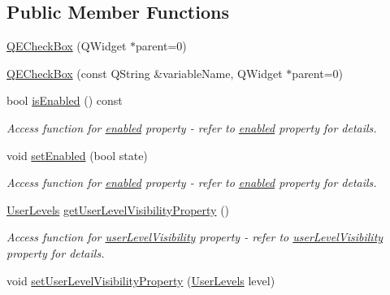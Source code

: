 \subsection*{Public Member Functions}
\begin{DoxyCompactItemize}
\item 
\hyperlink{classQECheckBox_a63681fe0a55f7f631d129968183af324}{QECheckBox} (QWidget $\ast$parent=0)
\item 
\hyperlink{classQECheckBox_a56de4a442b6ad1509ab2f1c8fcbd6dab}{QECheckBox} (const QString \&variableName, QWidget $\ast$parent=0)
\item 
\hypertarget{classQECheckBox_aa540e30941e0a55f48e05abe8d526637}{
bool \hyperlink{classQECheckBox_aa540e30941e0a55f48e05abe8d526637}{isEnabled} () const }
\label{classQECheckBox_aa540e30941e0a55f48e05abe8d526637}

\begin{DoxyCompactList}\small\item\em Access function for \hyperlink{classQECheckBox_afff99504d598628e0b8f06c54282935b}{enabled} property -\/ refer to \hyperlink{classQECheckBox_afff99504d598628e0b8f06c54282935b}{enabled} property for details. \end{DoxyCompactList}\item 
\hypertarget{classQECheckBox_a466f6c0b351177774ae7b3dbf142d0a4}{
void \hyperlink{classQECheckBox_a466f6c0b351177774ae7b3dbf142d0a4}{setEnabled} (bool state)}
\label{classQECheckBox_a466f6c0b351177774ae7b3dbf142d0a4}

\begin{DoxyCompactList}\small\item\em Access function for \hyperlink{classQECheckBox_afff99504d598628e0b8f06c54282935b}{enabled} property -\/ refer to \hyperlink{classQECheckBox_afff99504d598628e0b8f06c54282935b}{enabled} property for details. \end{DoxyCompactList}\item 
\hypertarget{classQECheckBox_a1e4fad96e6fdde194f81412f1bb164b6}{
\hyperlink{classQECheckBox_ab23fe060c72d50eaf52b879a58ee2611}{UserLevels} \hyperlink{classQECheckBox_a1e4fad96e6fdde194f81412f1bb164b6}{getUserLevelVisibilityProperty} ()}
\label{classQECheckBox_a1e4fad96e6fdde194f81412f1bb164b6}

\begin{DoxyCompactList}\small\item\em Access function for \hyperlink{classQECheckBox_ae919c2bf8265005e45e2c6de44839e8e}{userLevelVisibility} property -\/ refer to \hyperlink{classQECheckBox_ae919c2bf8265005e45e2c6de44839e8e}{userLevelVisibility} property for details. \end{DoxyCompactList}\item 
\hypertarget{classQECheckBox_a15f9613f413a53c33f8fc30263c39da8}{
void \hyperlink{classQECheckBox_a15f9613f413a53c33f8fc30263c39da8}{setUserLevelVisibilityProperty} (\hyperlink{classQECheckBox_ab23fe060c72d50eaf52b879a58ee2611}{UserLevels} level)}
\label{classQECheckBox_a15f9613f413a53c33f8fc30263c39da8}


\end{DoxyCompactItemize}
